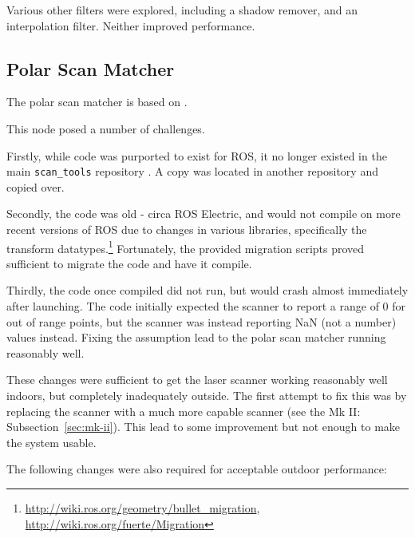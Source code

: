 \documentclass[12pt,oneside,a4paper]{book}
\begin{document}
Various other filters were explored, including a shadow remover, and
an interpolation filter. Neither improved performance.

\subsection{Polar Scan Matcher}
\label{sec:polar-scan-matcher}

The polar scan matcher is based on .

This node posed a number of challenges.

Firstly, while code was purported to exist for ROS, it no longer
existed in the main \texttt{scan\_tools} repository . A copy was located in another repository and copied
over.

Secondly, the code was old - circa ROS Electric, and would not compile on more recent
versions of ROS due to changes in various libraries, specifically the
transform datatypes.\footnote{
  \url{http://wiki.ros.org/geometry/bullet_migration},
  \url{http://wiki.ros.org/fuerte/Migration}} Fortunately, the
provided migration scripts proved sufficient to migrate the code and
have it compile.

Thirdly, the code once compiled did not run, but would crash almost
immediately after launching. The code initially expected the scanner
to report a range of 0 for out of range points, but the scanner was
instead reporting NaN (not a number) values instead. Fixing the
assumption lead to the polar scan matcher running reasonably well.

These changes were sufficient to get the laser scanner working
reasonably well indoors, but completely inadequately outside. The
first attempt to fix this was by replacing the scanner with a much
more capable scanner (see the Mk II: Subsection~\ref{sec:mk-ii}). This
lead to some improvement but not enough to make the system usable.

The following changes were also required for acceptable outdoor
performance:
\end{document}
